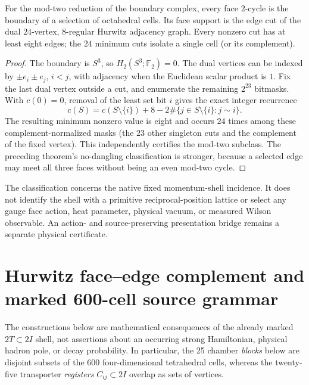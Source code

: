\documentclass[11pt]{article}
\begin{document}
\begin{proposition}
\label{p1:prop:v356-hurwitz-dual-cuts}
For the mod-two reduction of the boundary complex, every face
$2$-cycle is the boundary of a selection of octahedral cells.
Its face support is the edge cut of the dual $24$-vertex,
$8$-regular Hurwitz adjacency graph.  Every nonzero cut has at
least eight edges; the $24$ minimum cuts isolate a single
cell (or its complement).
\end{proposition}
\begin{proof}
The boundary is $S^3$, so $H_2(S^3;\mathbb F_2)=0$.
The dual vertices can be indexed by $\pm e_i\pm e_j$,
$i<j$, with adjacency when the Euclidean scalar product is $1$.
Fix the last dual vertex outside a cut, and enumerate the remaining
$2^{23}$ bitmasks.  With $c(0)=0$, removal of the least set bit $i$
gives the exact integer recurrence
\[
 c(S)=c(S\setminus\{i\})+8
       -2\#\{j\in S\setminus\{i\}:j\sim i\}.
\]
The resulting minimum nonzero value is eight and occurs $24$ times
among these complement-normalized masks (the $23$ other singleton
cuts and the complement of the fixed vertex).  This independently
certifies the mod-two subclass.  The preceding theorem's
no-dangling classification is stronger, because a selected edge
may meet all three faces without being an even mod-two cycle.
\end{proof}

\begin{remark}
\label{p1:rem:v356-no-face-action-selection}
\leavevmode\par
The classification concerns the native fixed momentum-shell
incidence.  It does not identify the shell with a primitive
reciprocal-position lattice or select any gauge face action, heat
parameter, physical vacuum, or measured Wilson observable.  An
action- and source-preserving presentation bridge remains a separate
physical certificate.
\end{remark}


\clearpage
\section{Hurwitz face--edge complement and marked 600-cell source grammar}
\label{p1:sec:v365-hurwitz-hadron-geometry}
The constructions below are mathematical consequences of the already
marked $2T\subset 2I$ shell, not assertions about an occurring strong
Hamiltonian, physical hadron pole, or decay probability.  In particular,
the 25 chamber \emph{blocks} below are disjoint subsets of the 600
four-dimensional tetrahedral cells, whereas the twenty-five transporter
\emph{registers} $C_{ij}\subset 2I$ overlap as sets of vertices.
\end{document}
